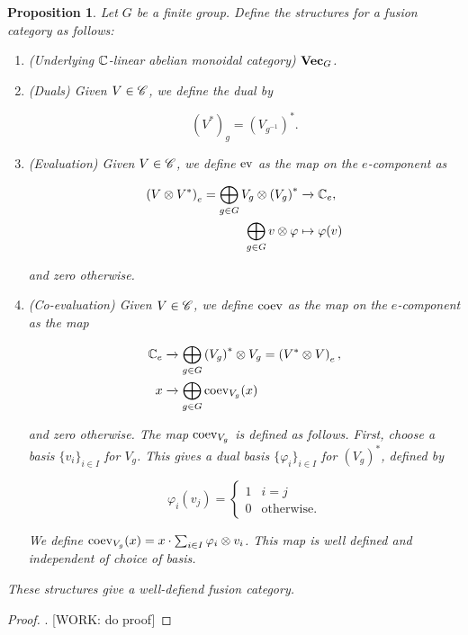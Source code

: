 \documentclass{article}
\newtheorem{proposition}{Proposition}[section]
\theoremstyle{definition}
\numberwithin{figure}{section}
\begin{document}
\begin{proposition} Let $G$ be a finite group. Define the structures for a fusion category as follows:

\begin{enumerate}
\item (Underlying $\mathbb{C}$-linear abelian monoidal category) $\bold{Vec}_G$.
\item (Duals) Given $V\in \mathscr{C}$, we define the dual by

$$\left(V^*\right)_g= \left(V_{g^{-1}}\right)^*.$$

\item (Evaluation) Given $V\in \mathscr{C}$, we define $\mathrm{ev}$ as the map on the $e$-component as

\begin{align*}
\left(V\otimes V^*\right)_e=\bigoplus_{g\in G}V_g\otimes \left(V_g\right)^*&\xrightarrow{} \mathbb{C}_e,\\
\bigoplus_{g\in G}v\otimes \varphi & \mapsto \varphi(v)
\end{align*}

and zero otherwise.

\item (Co-evaluation) Given $V\in \mathscr{C}$, we define $\mathrm{coev}$ as the map on the $e$-component as the map

\begin{align*}
\mathbb{C}_e&\xrightarrow{}\bigoplus_{g\in G}\left(V_g\right)^*\otimes V_g=\left(V^*\otimes V\right)_e,\\
x&\xrightarrow{} \bigoplus_{g\in G}\mathrm{coev}_{V_g}(x)
\end{align*}

and zero otherwise. The map $\mathrm{coev}_{V_g}$ is defined as follows. First, choose a basis $\{v_i\}_{i\in I}$ for $V_g$. This gives a dual basis $\{\varphi_i\}_{i\in I}$ for $\left(V_g\right)^*$, defined by

$$\varphi_i(v_j)=
\begin{cases}
1 & i=j\\
0 & \text{otherwise.}
\end{cases}$$

We define $\mathrm{coev}_{V_g}(x)=x\cdot \sum_{i\in I}\varphi_i\otimes v_i$. This map is well defined and independent of choice of basis.
\end{enumerate}

These structures give a well-defiend fusion category.
\end{proposition}
\begin{proof}. [WORK: do proof]
\end{proof}
\end{document}
